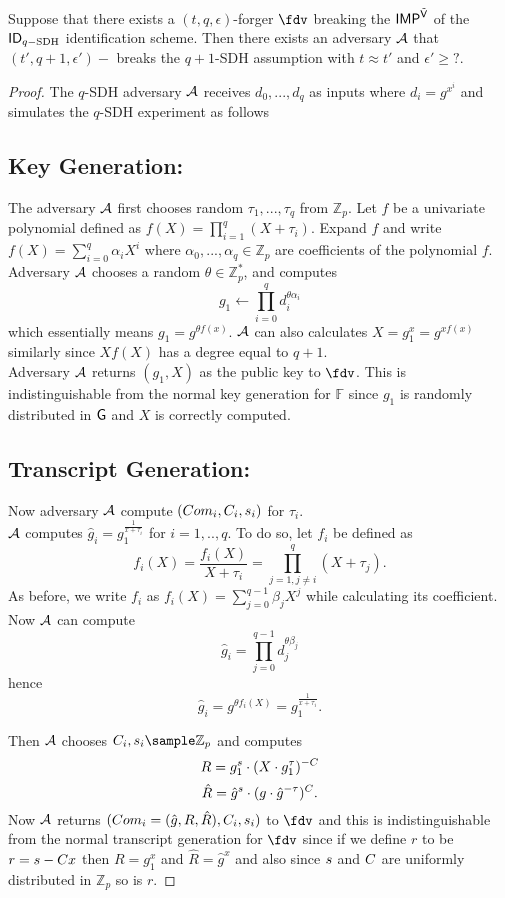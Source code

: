 \begin{theorem}
Suppose that there exists a $(t, q, \epsilon)$-forger $\fdv$ breaking the $\mathsf{IMP}^{\tilde{\mathsf{V}}}$ of the $\mathsf{ID}_{q-\text{SDH}}$ identification scheme. Then there exists an adversary $\mathcal{A}$ that $(t',q+1,\epsilon')-$ breaks the $q+1$-SDH assumption with $t \approx t'$ and 
$\epsilon' \geq ?.$
\end{theorem}
\begin{proof}
The $q$-SDH adversary $\mathcal{A}$ receives $d_0,...,d_q$ as inputs where $d_i = g^{x^i}$ and simulates the $q$-SDH experiment as follows
\subsection*{Key Generation:} The adversary $\mathcal{A}$ first chooses random $\tau_1,...,\tau_q$ from $\mathbb{Z}_p$. Let $f$ be a univariate polynomial defined as 
$f(X) = \prod_{i=1}^q (X+\tau_i)$. Expand $f$ and write $f(X) = \sum_{i=0}^q \alpha_i X^i$ where
$\alpha_0,...,\alpha_q \in \mathbb{Z}_p$ are coefficients of the polynomial $f$. Adversary $\mathcal{A}$ chooses a random $\theta \in \mathbb{Z}^*_p$, and computes
$$g_1 \leftarrow \prod_{i=0}^q d_i^{\theta\alpha_i}$$
which essentially means $g_1 = g^{\theta f(x)}$. $\mathcal{A}$ can also calculates 
$X = g_1^x = g^{xf(x)}$ similarly since $Xf(X)$ has a degree equal to $q+1$.
\\
Adversary $\mathcal{A}$ returns $(g_1,X)$ as the public key to $\fdv$. This is indistinguishable from the normal key generation for $\mathbb{F}$ since $g_1$ is randomly distributed in $\mathsf{G}$ and $X$ is correctly computed.

\subsection*{Transcript Generation:}
Now adversary $\mathcal{A}$ compute $(Com_i,C_i,s_i)$ for $\tau_i$.
\\
$\mathcal{A}$ computes
$\hat{g}_i = g_1^{\frac{1}{x+\tau_i}}$ for $i = 1,..,q$. To do so, let $f_i$ be defined as
$$f_i(X) = \frac{f_i(X)}{X+\tau_i} = \prod_{j=1, j \neq i}^q (X+ \tau_j).$$
As before, we write $f_i$ as 
$f_i(X) = \sum_{j=0}^{q-1} \beta_jX^j$ while calculating its coefficient.  Now $\mathcal{A}$ can compute
$$\hat{g}_i = \prod_{j=0}^{q-1} d_j^{\theta\beta_j}$$
hence
$$\hat{g}_i = g^{\theta f_i(X)} =  g_1^{\frac{1}{x+\tau_i}}.$$




 Then $\mathcal{A}$ chooses  $\c_i,\s_i\sample\mathbb{Z}_p$ and computes
$$R = g_1^s \cdot(X\cdot g_1^{\tau})^{-C} $$
$$\hat{R} = \hat{g}^s \cdot (g\cdot \hat{g}^{-\tau} )^C.$$
Now $\mathcal{A}$ returns $(Com_i = (\hat{g},R,\hat{R}),C_i,s_i)$ to $\fdv$ and this is indistinguishable from the normal transcript generation for $\fdv$ since if we define $r$ to be $r = s-C x$ then $R = g_1^x$ and 
$\hat{R} = \hat{g}^x$ and also since $s$ and $C$ are uniformly distributed in $\mathbb{Z}_p$ so is $r$.

\end{proof}
